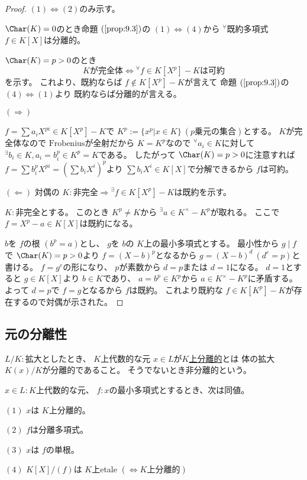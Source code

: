\documentclass[../master_galois_theory]{subfiles}
\begin{document}
\begin{proof}
  $(1) \Leftrightarrow (2)$のみ示す。

  $\Char(K) = 0$のとき命題 $(\mathrm{\ref{prop:9.3}})$の
  $(1) \Leftrightarrow (4)$から ${}^\forall$既約多項式 $f \in K[X]$は分離的。

  $\Char(K) = p > 0$のとき
  \[
  Kが完全体 \Leftrightarrow {}^\forall f \in K[X^p] - K は可約
  \]
  を示す。
  これより、既約ならば $f \notin K[X^p] - K$が言えて
  命題 $(\mathrm{\ref{prop:9.3}})$の $(4) \Leftrightarrow (1)$より
  既約ならば分離的が言える。

  $(\Rightarrow)$

  $f = \sum a_i X^{pi} \in K[X^p] - K$で
  $K^p := \{ x^p | x \in K \} \  (p乗元の集合)$とする。
  $K$が完全体なので $\mathrm{Frobenius}$が全射だから
  $K = K^p$なので ${}^\forall a_i \in K$に対して
  ${}^\exists b_i \in K , a_i = b_i^p \in K^p = K$である。
  したがって $\Char(K) = p > 0$に注意すれば
  $f = \sum b_i^p X^{pi} = (\sum b_i X^i)^p$より
  $\sum b_i X^i \in K[X]$で分解できるから $f$は可約。

  $(\Leftarrow)$
  対偶の $K:非完全 \Rightarrow {}^\exists f \in K[X^p] - K は既約$を示す。

  $K:$非完全とする。
  このとき $K^p \neq K$から ${}^\exists a \in K^\times - K^p$が取れる。
  ここで $f = X^p - a \in K[X]$は既約になる。

  $b$を $f$の根 $(b^p = a)$とし、
  $g$を $b$の $K$上の最小多項式とする。
  最小性から $g \mid f$で $\Char(K) = p > 0$より
  $f = (X - b)^p$となるから
  $g = (X - b)^d \  (d^e = p)$と書ける。
  $f = g^e$の形になり、 $p$が素数から
  $d = p$または $d = 1$になる。
  $d = 1$とすると $g \in K[X]$より $b \in K$であり、 $a = b^p \in K^p$から
  $a \in K^\times - K^p$に矛盾する。
  よって $d = p$で $f = g$となるから $f$は既約。
  これより既約な $f \in K[K^p] - K$が存在するので対偶が示された。
\end{proof}

\subsection{元の分離性}

\begin{defi}
  $L/K:$拡大としたとき、
  $K$上代数的な元 $x \in L$が\underline{$K$上分離的}とは
  体の拡大$K(x)/K$が分離的であること。
  そうでないとき非分離的という。
\end{defi}

\begin{prop} \label{prop:9.5}
  $x \in L:K$上代数的な元、 $f:x$の最小多項式とするとき、次は同値。

  $(1)$
  $x$は $K$上分離的。

  $(2)$
  $f$は分離多項式。

  $(3)$
  $x$は $f$の単根。

  $(4)$
  $K[X]/(f)$は $K$上\rm{etale} $(\Leftrightarrow K上分離的)$
\end{prop}
\end{document}
